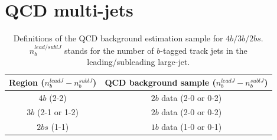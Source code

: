 \section{QCD multi-jets}
\label{sec:boosted-qcd}

\begin{table}[htb!]
\begin{center}
\caption{Definitions of the QCD background estimation sample for $4b/3b/2bs$. $n^{lead/sublJ}_{b}$ stands for the number of $b$-tagged track jets in the leading/subleading large-\R jet.}
\begin{tabular}{c|c}
\hline
  Region ($n^{leadJ}_{b} - n^{sublJ}_{b}$)  & QCD background sample ($n^{leadJ}_{b} - n^{sublJ}_{b}$) \\
  \hline
  $4b$ (2-2) & $2b$ data (2-0 or 0-2) \\
  $3b$ (2-1 or 1-2)& $2b$ data (2-0 or 0-2) \\
  $2bs$ (1-1) & $1b$ data (1-0 or 0-1) \\
  \end{tabular}
\label{tab:boosted-qcd-bkgsample}
\end{center}
\end{table}

